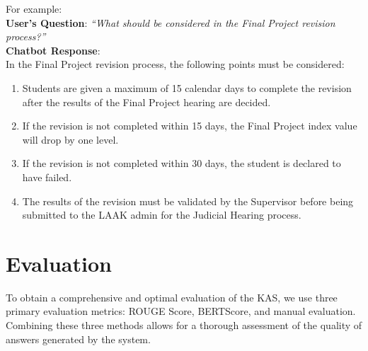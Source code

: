\documentclass[runningheads]{llncs}
\begin{document}
For example: \\
\textbf{User's Question}: \textit{``What should be considered in the Final Project revision process?''} \\

\textbf{Chatbot Response}: \\
In the Final Project revision process, the following points must be considered:
\begin{enumerate}
    \item Students are given a maximum of 15 calendar days to complete the revision after the results of the Final Project hearing are decided.
    \item If the revision is not completed within 15 days, the Final Project index value will drop by one level.
    \item If the revision is not completed within 30 days, the student is declared to have failed.
    \item The results of the revision must be validated by the Supervisor before being submitted to the LAAK admin for the Judicial Hearing process.
\end{enumerate}


\section{Evaluation}
To obtain a comprehensive and optimal evaluation of the KAS, we use three primary evaluation metrics: ROUGE Score, BERTScore, and manual evaluation. Combining these three methods allows for a thorough assessment of the quality of answers generated by the system.
\end{document}
